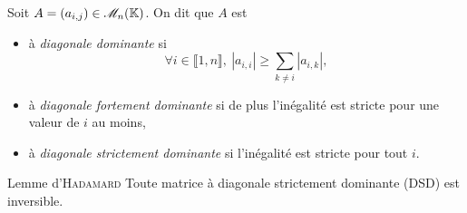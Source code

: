 \begin{tcolorbox}
    Soit $A = (a_{i,j}) \in \mathscr{M}_n(\mathbb{K})$. On dit que $A$ est 
    \begin{itemize}
        \item à \emph{diagonale dominante} si
        $$\forall i \in \llbracket 1, n \rrbracket,\ |a_{i,i}| \geqslant \sum_{k \not = i} |a_{i,k}|,$$
        \item à \emph{diagonale fortement dominante} si de plus l'inégalité est stricte pour une valeur de $i$ au moins,
        \item à \emph{diagonale strictement dominante} si l'inégalité est stricte pour tout $i$. 
    \end{itemize}
\end{tcolorbox}

\begin{box_titre}{Lemme d'\textsc{Hadamard} \label{lemme_hadamard}}
    Toute matrice à diagonale strictement dominante (DSD) est inversible.
\end{box_titre}
